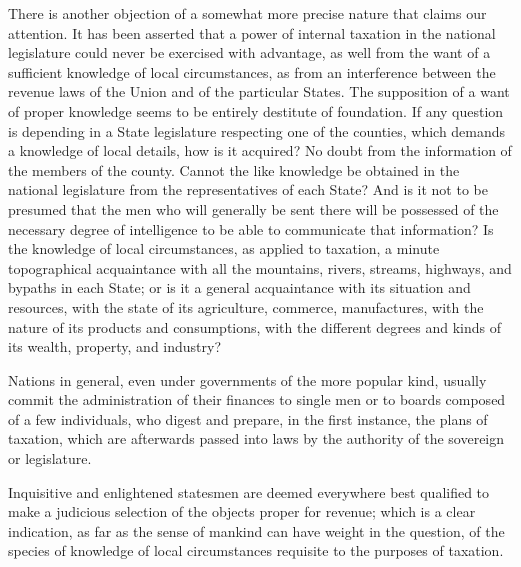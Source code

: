 There is another objection of a somewhat more precise nature that claims our attention. 
It has been asserted that a power of internal taxation in the national legislature could never be exercised with advantage, as well from the want of a sufficient knowledge of local circumstances, as from an interference between the revenue laws of the Union and of the particular States. 
The supposition of a want of proper knowledge seems to be entirely destitute of foundation. 
If any question is depending in a State legislature respecting one of the counties, which demands a knowledge of local details, how is it acquired? 
No doubt from the information of the members of the county. 
Cannot the like knowledge be obtained in the national legislature from the representatives of each State? 
And is it not to be presumed that the men who will generally be sent there will be possessed of the necessary degree of intelligence to be able to communicate that information? 
Is the knowledge of local circumstances, as applied to taxation, a minute topographical acquaintance with all the mountains, rivers, streams, highways, and bypaths in each State; or is it a general acquaintance with its situation and resources, with the state of its agriculture, commerce, manufactures, with the nature of its products and consumptions, with the different degrees and kinds of its wealth, property, and industry?

Nations in general, even under governments of the more popular kind, usually commit the administration of their finances to single men or to boards composed of a few individuals, who digest and prepare, in the first instance, the plans of taxation, which are afterwards passed into laws by the authority of the sovereign or legislature.

Inquisitive and enlightened statesmen are deemed everywhere best qualified to make a judicious selection of the objects proper for revenue; which is a clear indication, as far as the sense of mankind can have weight in the question, of the species of knowledge of local circumstances requisite to the purposes of taxation.

